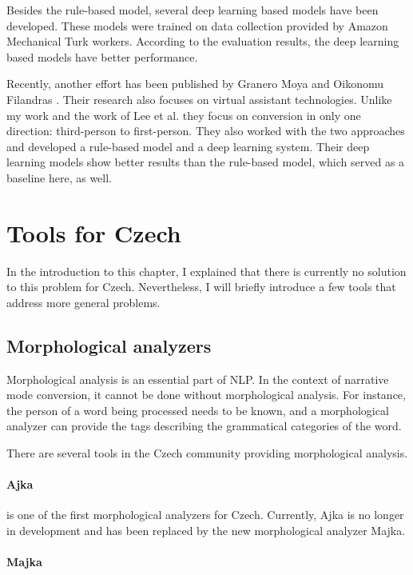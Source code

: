 Besides the rule-based model, several deep learning based models have been developed. These models were trained on data collection provided by Amazon Mechanical Turk workers. According to the evaluation results, the deep learning based models have better performance.

Recently, another effort has been published by Granero Moya and Oikonomu Filandras \cite{granero-moya-oikonomou-filandras-2021-taking}. Their research also focuses on virtual assistant technologies. Unlike my work and the work of Lee et al. they focus on conversion in only one direction: third-person to first-person. They also worked with the two approaches and developed a rule-based model and a deep learning system. Their deep learning models show better results than the rule-based model, which served as a baseline here, as well.

\section{Tools for Czech}

In the introduction to this chapter, I explained that there is currently no solution to this problem for Czech. Nevertheless, I will briefly introduce a few tools that address more general problems.

\subsection{Morphological analyzers}

Morphological analysis is an essential part of NLP. In the context of narrative mode conversion, it cannot be done without morphological analysis. For instance, the person of a word being processed needs to be known, and a morphological analyzer can provide the tags describing the grammatical categories of the word.

There are several tools in the Czech community providing morphological analysis.

\paragraph{Ajka}

is one of the first morphological analyzers for Czech. Currently, Ajka is no longer in development and has been replaced by the new morphological analyzer Majka. \cite{Sedlacekthesis}

\paragraph{Majka}

